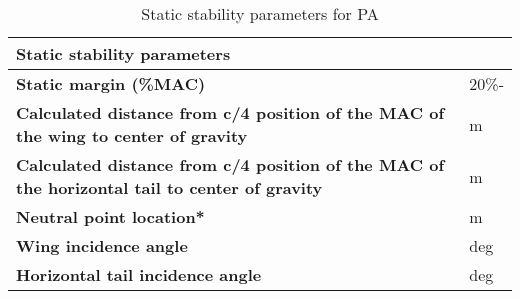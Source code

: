\begin{table}[H]
\centering
    \begin{tabular}{@{}ll@{}}
    \toprule
    \textbf{Static stability parameters}                                                                  &       \\ \midrule
    \textbf{Static margin (\%MAC)}                                                                        & 20\%- \\
    \textbf{Calculated distance from c/4 position of the MAC of the wing to center of gravity}            & m     \\
    \textbf{Calculated distance from c/4 position of the MAC of the horizontal tail to center of gravity} & m     \\
    \textbf{Neutral point location*}                                                                      & m     \\
    \textbf{Wing incidence angle}                                                                         & deg   \\
    \textbf{Horizontal tail incidence angle}                                                              & deg   \\ \bottomrule
    \end{tabular}
\caption{Static stability parameters for PA}
\label{tab: pa_static}
\end{table}